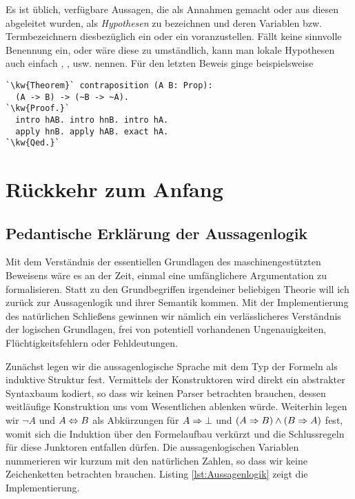 Es ist üblich, verfügbare Aussagen, die als Annahmen gemacht
oder aus diesen abgeleitet wurden, als \emph{Hypothesen} zu bezeichnen
und deren Variablen bzw. Termbezeichnern diesbezüglich ein  oder
ein  voranzustellen. Fällt keine sinnvolle Benennung ein,
oder wäre diese zu umständlich, kann man lokale Hypothesen auch
einfach , ,  usw. nennen. Für den letzten
Beweis ginge beispielsweise

\begin{lstlisting}[escapechar=`, xleftmargin=\mathindent]
`\kw{Theorem}` contraposition (A B: Prop):
  (A -> B) -> (~B -> ~A).
`\kw{Proof.}`
  intro hAB. intro hnB. intro hA.
  apply hnB. apply hAB. exact hA.
`\kw{Qed.}`
\end{lstlisting}

\newpage
\section{Rückkehr zum Anfang}

\subsection{Pedantische Erklärung der Aussagenlogik}

Mit dem Verständnis der essentiellen Grundlagen des maschinengestützten
Beweisens wäre es an der Zeit, einmal eine umfänglichere Argumentation zu
formalisieren. Statt zu den Grundbegriffen irgendeiner beliebigen Theorie
will ich zurück zur Aussagenlogik und ihrer Semantik kommen. Mit der
Implementierung des natürlichen Schließens gewinnen wir nämlich ein
verlässlicheres Verständnis der logischen Grundlagen, frei von potentiell
vorhandenen Ungenauigkeiten, Flüchtigkeitsfehlern oder Fehldeutungen.

Zunächst legen wir die aussagenlogische Sprache mit dem Typ der Formeln
als induktive Struktur fest. Vermittels der Konstruktoren wird direkt ein
abstrakter Syntaxbaum kodiert, so dass wir keinen Parser betrachten brauchen,
dessen weitläufige Konstruktion uns vom Wesentlichen ablenken würde.
Weiterhin legen wir $\lnot A$ und $A\Leftrightarrow B$
als Abkürzungen für $A\Rightarrow\bot$ und $(A\Rightarrow B)\land (B\Rightarrow A)$ fest,
womit sich die Induktion über den Formelaufbau verkürzt und die Schlussregeln
für diese Junktoren entfallen dürfen. Die aussagenlogischen Variablen
nummerieren wir kurzum mit den natürlichen Zahlen, so dass wir keine
Zeichenketten betrachten brauchen. Listing \ref{lst:Aussagenlogik}
zeigt die Implementierung.

